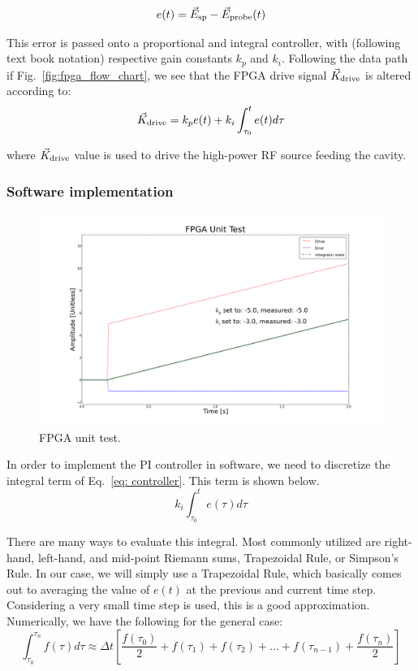 \documentclass[a4paper,12pt]{article}
\newcommand{\be}{\begin{equation}}
\newcommand{\ee}{\end{equation}}
\begin{document}
\be
e(t) = \vec{E}_{\rm sp} - \vec{E}_{\rm probe}(t)
\ee

\noindent This error is passed onto a proportional and integral controller, with (following text book notation) respective gain constants $k_{p}$ and $k_{i}$. Following the data path if Fig.~\ref{fig:fpga_flow_chart}, we see that the FPGA drive signal $\vec{K}_{\rm drive}$ is altered according to:
\be \label{eq: controller}
\vec{K}_{\rm drive} = k_{p} e(t) + k_{i} \int_{\tau_{0}}^{t} e(t) d\tau
\ee

\noindent where $\vec{K}_{\rm drive}$ value is used to drive the high-power RF source feeding the cavity.

\subsubsection{Software implementation}

\begin{figure}
\centering
\includegraphics[scale=0.25]{../figures/fpga_unit_test.png}
\caption{FPGA unit test.}
\label{fig:fpga_unit_test}
\end{figure}

In order to implement the PI controller in software, we need to discretize the integral term of Eq.~\ref{eq: controller}. This term is shown below.
\be
k_{i} \int_{\tau_{0}}^{t} e(\tau)d\tau
\ee

There are many ways to evaluate this integral. Most commonly utilized are right-hand, left-hand, and mid-point Riemann sums, Trapezoidal Rule, or Simpson's Rule. In our case, we will simply use a Trapezoidal Rule, which basically comes out to averaging the value of $e(t)$ at the previous and current time step. Considering a very small time step is used, this is a good approximation. Numerically, we have the following for the general case:
\be
\int_{\tau_{0}}^{\tau_{n}} f(\tau) d\tau \approx \Delta t
		    \left[\frac{f(\tau_{0})}{2} + f(\tau_{1}) + f(\tau_{2}) + ...
		      + f(\tau_{n-1}) + \frac{f(\tau_{n})}{2}\right]
\ee
\end{document}
